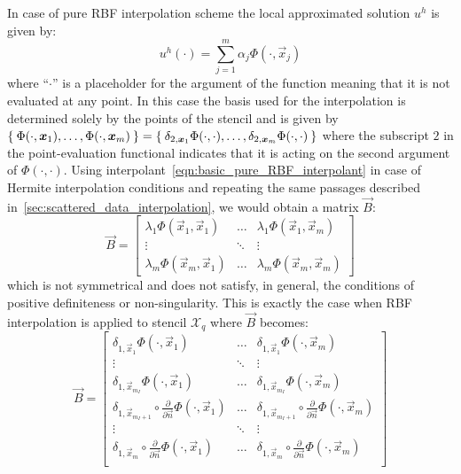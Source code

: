 In case of pure RBF interpolation scheme the local approximated solution $u^h$ is given by:
\begin{equation}
	\label{eqn:basic_pure_RBF_interpolant}
	u^h(\cdot) = \sum_{j=1}^{m} \alpha_j \Phi(\cdot,\vec{x}_j)
\end{equation}
where ``$\cdot$'' is a placeholder for the argument of the function meaning that it is not evaluated at any point. In this case the basis used for the interpolation is determined solely by the points of the stencil and is given by $\Set{\Phi(\cdot,\boldsymbol{x}_1), \dots, \Phi(\cdot,\boldsymbol{x}_m)} = \Set{\delta_{2,\boldsymbol{x}_1}\Phi(\cdot,\cdot), \dots, \delta_{2,\boldsymbol{x}_m}\Phi(\cdot,\cdot)}$ where the subscript $2$ in the point-evaluation functional indicates that it is acting on the second argument of $\Phi(\cdot, \cdot)$. Using interpolant~\eqref{eqn:basic_pure_RBF_interpolant} in case of Hermite interpolation conditions and repeating the same passages described in~\vref{sec:scattered_data_interpolation}, we would obtain a matrix $\vec{B}$:
\begin{equation}
	\label{eqn:unsymmetric_B}
	\vec{B} = 
	\begin{bmatrix}
		\lambda_1 \Phi(\vec{x}_1, \vec{x}_1)  &  \dots  & \lambda_1 \Phi(\vec{x}_1, \vec{x}_m)  \\
		\vdots								  & \ddots	& \vdots								 \\
		\lambda_m \Phi(\vec{x}_m, \vec{x}_1)  &  \dots  & \lambda_m \Phi(\vec{x}_m, \vec{x}_m)
	\end{bmatrix}
\end{equation}
which is not symmetrical and does not satisfy, in general, the conditions of positive definiteness or non-singularity. This is exactly the case when RBF interpolation is applied to stencil $\mathcal{X}_q$ where $\vec{B}$ becomes:
\begin{equation}
	\label{eqn:unsymmetric_B_RBF-FD}
	\vec{B} = 
	\begin{bmatrix}
		\delta_{1,\vec{x}_1} \Phi(\cdot, \vec{x}_1)  &  \dots  & \delta_{1,\vec{x}_1} \Phi(\cdot, \vec{x}_m)  			\\
		\vdots								  & \ddots	& \vdots								 						\\
		\delta_{1,\vec{x}_{m_I}} \Phi(\cdot, \vec{x}_1)  &  \dots  & \delta_{1,\vec{x}_{m_I}} \Phi(\cdot, \vec{x}_m)	\\
		\delta_{1,\vec{x}_{m_I+1}} \circ \frac{\partial}{\partial \vec{n}} \Phi(\cdot, \vec{x}_1)  &  \dots  & \delta_{1,\vec{x}_{m_I+1}} \circ \frac{\partial}{\partial \vec{n}} \Phi(\cdot, \vec{x}_m)	\\
		\vdots								  & \ddots	& \vdots								 						\\
		\delta_{1,\vec{x}_{m}} \circ \frac{\partial}{\partial \vec{n}} \Phi(\cdot, \vec{x}_1)  &  \dots  & \delta_{1,\vec{x}_{m}} \circ \frac{\partial}{\partial \vec{n}} \Phi(\cdot, \vec{x}_m)	\\
	\end{bmatrix}
\end{equation}
